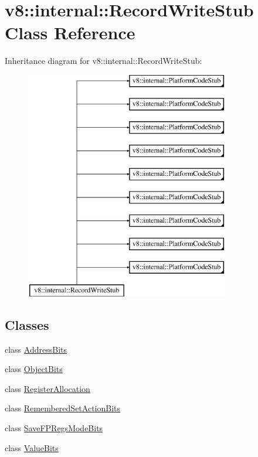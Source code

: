 \hypertarget{classv8_1_1internal_1_1_record_write_stub}{}\section{v8\+:\+:internal\+:\+:Record\+Write\+Stub Class Reference}
\label{classv8_1_1internal_1_1_record_write_stub}
Inheritance diagram for v8\+:\+:internal\+:\+:Record\+Write\+Stub\+:\begin{figure}[H]
\begin{center}
\leavevmode
\includegraphics[height=10.000000cm]{classv8_1_1internal_1_1_record_write_stub}
\end{center}
\end{figure}
\subsection*{Classes}
\begin{DoxyCompactItemize}
\item 
class \hyperlink{classv8_1_1internal_1_1_record_write_stub_1_1_address_bits}{Address\+Bits}
\item 
class \hyperlink{classv8_1_1internal_1_1_record_write_stub_1_1_object_bits}{Object\+Bits}
\item 
class \hyperlink{classv8_1_1internal_1_1_record_write_stub_1_1_register_allocation}{Register\+Allocation}
\item 
class \hyperlink{classv8_1_1internal_1_1_record_write_stub_1_1_remembered_set_action_bits}{Remembered\+Set\+Action\+Bits}
\item 
class \hyperlink{classv8_1_1internal_1_1_record_write_stub_1_1_save_f_p_regs_mode_bits}{Save\+F\+P\+Regs\+Mode\+Bits}
\item 
class \hyperlink{classv8_1_1internal_1_1_record_write_stub_1_1_value_bits}{Value\+Bits}
\end{DoxyCompactItemize}
